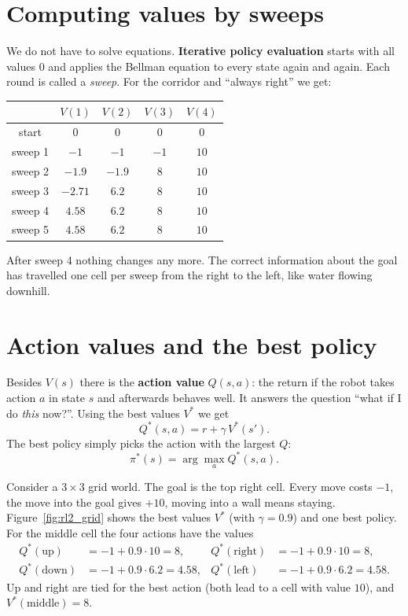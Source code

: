 \section*{Computing values by sweeps}
We do not have to solve equations. \textbf{Iterative policy evaluation} starts with all values $0$ and applies the Bellman equation to every state again and again. Each round is called a \emph{sweep}. For the corridor and ``always right'' we get:

\begin{center}
\renewcommand{\arraystretch}{1.2}
\begin{tabular}{c|cccc}
 & $V(1)$ & $V(2)$ & $V(3)$ & $V(4)$\\ \hline
start & $0$ & $0$ & $0$ & $0$\\
sweep 1 & $-1$ & $-1$ & $-1$ & $10$\\
sweep 2 & $-1.9$ & $-1.9$ & $8$ & $10$\\
sweep 3 & $-2.71$ & $6.2$ & $8$ & $10$\\
sweep 4 & $4.58$ & $6.2$ & $8$ & $10$\\
sweep 5 & $4.58$ & $6.2$ & $8$ & $10$\\
\end{tabular}
\end{center}
After sweep 4 nothing changes any more. The correct information about the goal has travelled one cell per sweep from the right to the left, like water flowing downhill.

\section*{Action values and the best policy}
Besides $V(s)$ there is the \textbf{action value} $Q(s,a)$: the return if the robot takes action $a$ in state $s$ and afterwards behaves well. It answers the question ``what if I do \emph{this} now?''. Using the best values $V^*$ we get
\[
Q^*(s,a)=r+\gamma\,V^*(s') .
\]
The best policy simply picks the action with the largest $Q$:
\[
\pi^*(s)=\arg\max_a Q^*(s,a).
\]

\begin{example}
Consider a $3\times3$ grid world. The goal is the top right cell. Every move costs $-1$, the move into the goal gives $+10$, moving into a wall means staying. Figure~\ref{fig:rl2_grid} shows the best values $V^*$ (with $\gamma=0.9$) and one best policy. For the middle cell the four actions have the values
\begin{align*}
Q^*(\text{up})&=-1+0.9\cdot10=8, & Q^*(\text{right})&=-1+0.9\cdot10=8,\\
Q^*(\text{down})&=-1+0.9\cdot6.2=4.58, & Q^*(\text{left})&=-1+0.9\cdot6.2=4.58 .
\end{align*}
Up and right are tied for the best action (both lead to a cell with value $10$), and $V^*(\text{middle})=8$.
\end{example}

